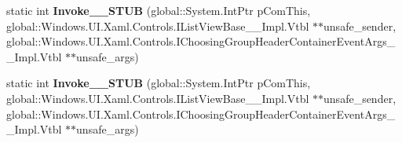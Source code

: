 \begin{DoxyCompactItemize}
\item 
\mbox{\label{struct_windows_1_1_foundation_1_1_typed_event_handler___a___windows___u_i___xaml___controls___li89c076cde303fbaf0fcbca1d0fe1cbb9_ab78ad9b1b78ced46a0ef1ecc9f3a7a21}} 
static int {\bfseries Invoke\+\_\+\+\_\+\+S\+T\+UB} (global\+::\+System.\+Int\+Ptr p\+Com\+This, global\+::\+Windows.\+U\+I.\+Xaml.\+Controls.\+I\+List\+View\+Base\+\_\+\+\_\+\+Impl.\+Vtbl $\ast$$\ast$unsafe\+\_\+sender, global\+::\+Windows.\+U\+I.\+Xaml.\+Controls.\+I\+Choosing\+Group\+Header\+Container\+Event\+Args\+\_\+\+\_\+\+Impl.\+Vtbl $\ast$$\ast$unsafe\+\_\+args)
\item 
\mbox{\label{struct_windows_1_1_foundation_1_1_typed_event_handler___a___windows___u_i___xaml___controls___li89c076cde303fbaf0fcbca1d0fe1cbb9_ab78ad9b1b78ced46a0ef1ecc9f3a7a21}} 
static int {\bfseries Invoke\+\_\+\+\_\+\+S\+T\+UB} (global\+::\+System.\+Int\+Ptr p\+Com\+This, global\+::\+Windows.\+U\+I.\+Xaml.\+Controls.\+I\+List\+View\+Base\+\_\+\+\_\+\+Impl.\+Vtbl $\ast$$\ast$unsafe\+\_\+sender, global\+::\+Windows.\+U\+I.\+Xaml.\+Controls.\+I\+Choosing\+Group\+Header\+Container\+Event\+Args\+\_\+\+\_\+\+Impl.\+Vtbl $\ast$$\ast$unsafe\+\_\+args)
\end{DoxyCompactItemize}
